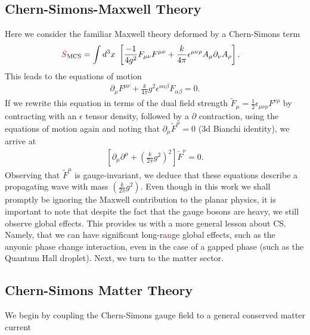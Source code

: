     \subsection{Chern-Simons-Maxwell Theory}
    Here we consider the familiar Maxwell theory deformed by a Chern-Simons term
    \begin{align}
        \textcolor{red}{S}_{\text{MCS}} &= \int d^3x \ \left[ \frac{-1}{4 g^2} F_{\mu \nu} F^{\mu \nu} + \frac{k}{4 \pi} \epsilon^{\mu \nu \rho} A_{\mu} \partial_{\nu} A_{\rho} \right].
    \end{align}
    This leads to the equations of motion
    \begin{align}
        \partial_{\mu} F^{\mu \nu} + \frac{k}{4\pi} g^2 \epsilon^{\nu \alpha \beta}F_{\alpha \beta} =0.
    \end{align}
    If we rewrite this equation in terms of the dual field strength $\tilde{F}_{\mu} = \frac{1}{2} \epsilon_{\mu\nu\rho} F^{\nu\rho}$ by contracting with an $\epsilon$ tensor density, followed by a $\partial$ contraction, using the equations of motion again and noting that $\partial_{\mu} \tilde{F}^{\mu} =0$ (3d Bianchi identity), we arrive at 
    \begin{align}
        \left[\partial_{\mu} \partial^{\mu} + \left(\frac{k}{2 \pi} g^2 \right)^2 \right] \tilde{F}^{\nu}=0.
    \end{align}
    Observing that $\tilde{F}^{\mu}$ is gauge-invariant, we deduce that these equations describe a propagating wave with mass $\left(\frac{k}{2 \pi} g^2 \right)$.
    Even though in this work we shall promptly be ignoring the Maxwell contribution to the planar physics, it is important to note that despite the fact that the gauge bosons are heavy, we still observe global effects. This provides us with a more general lesson about CS. Namely, that we can have significant long-ra\textcolor{red}{n}ge global effects, such as the anyonic phase change interaction, even in the case of a gapped phase (such as the Quantum Hall droplet).
    Next, we turn to the matter sector.
    \subsection{Chern-Simons Matter Theory}
    
    We begin by coupling the Chern-Simons gauge field to a general conserved matter current


